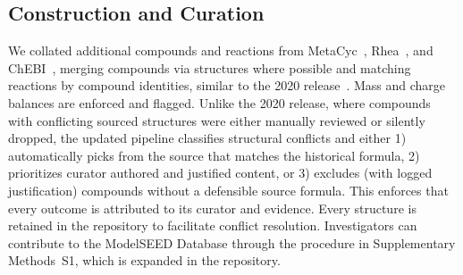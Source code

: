 \subsection{Construction and Curation}\label{sec:methods-construction}

We collated additional compounds and reactions from MetaCyc~\cite{caspi2020}, Rhea~\cite{bansal2022}, and ChEBI~\cite{hastings2016}, merging compounds via structures where possible and matching reactions by compound identities, similar to the 2020 release~\cite{seaver2020}.
Mass and charge balances are enforced and flagged.
Unlike the 2020 release, where compounds with conflicting sourced structures were either manually reviewed or silently dropped, the updated pipeline classifies structural conflicts and either 1) automatically picks from the source that matches the historical formula, 2) prioritizes curator authored and justified content, or 3) excludes (with logged justification) compounds without a defensible source formula.
This enforces that every outcome is attributed to its curator and evidence.
Every structure is retained in the repository to facilitate conflict resolution.
Investigators can contribute to the ModelSEED Database through the procedure in Supplementary Methods~S1, which is expanded in the repository.